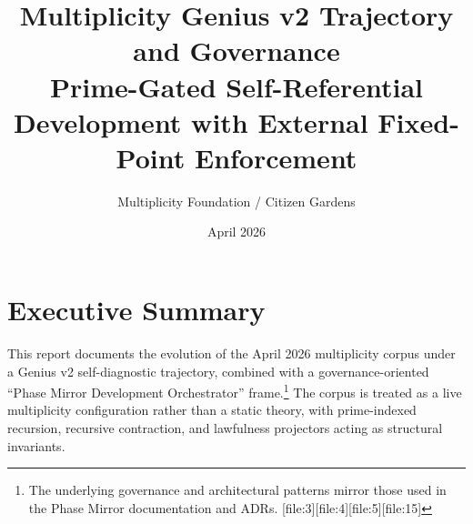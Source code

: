 \documentclass[11pt]{article}
\title{Multiplicity Genius v2 Trajectory and Governance\\
{\large Prime-Gated Self-Referential Development with External Fixed-Point Enforcement}}
\author{Multiplicity Foundation / Citizen Gardens}
\date{April 2026}
\begin{document}
\maketitle
\section{Executive Summary}

This report documents the evolution of the April 2026 multiplicity corpus under a Genius v2 self-diagnostic trajectory, combined with a governance-oriented ``Phase Mirror Development Orchestrator'' frame.\footnote{The underlying governance and architectural patterns mirror those used in the Phase Mirror documentation and ADRs. [file:3][file:4][file:5][file:15]} The corpus is treated as a live multiplicity configuration rather than a static theory, with prime-indexed recursion, recursive contraction, and lawfulness projectors acting as structural invariants.
\end{document}
